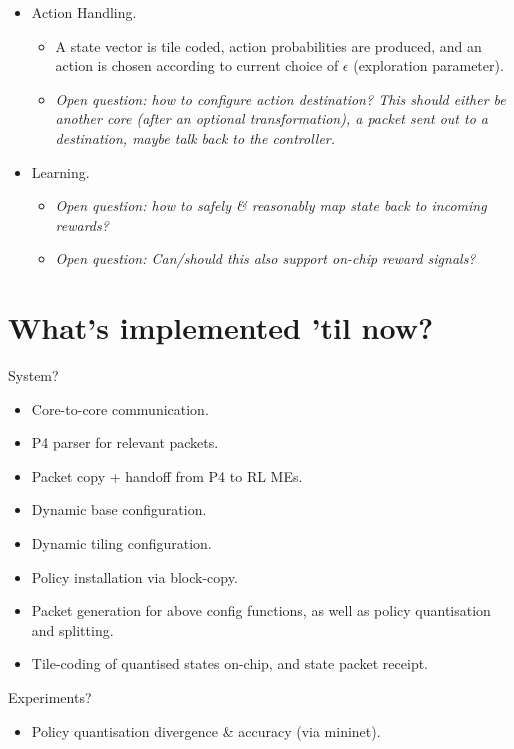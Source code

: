 \documentclass[sigconf,natbib=false]{acmart}
\begin{document}
\begin{itemize}
	\item Action Handling.
	\begin{itemize}
		\item A state vector is tile coded, action probabilities are produced, and an action is chosen according to current choice of $\epsilon$ (exploration parameter).
		\item \emph{Open question: how to configure action destination? This should either be another core (after an optional transformation), a packet sent out to a destination, maybe talk back to the controller.}
	\end{itemize}
	\item Learning.
	\begin{itemize}
		\item \emph{Open question: how to safely \& reasonably map state back to incoming rewards?}
		\item \emph{Open question: Can/should this also support on-chip reward signals?}
	\end{itemize}
\end{itemize}

\section{What's implemented 'til now?}
System?
\begin{itemize}
	\item Core-to-core communication.
	\item P4 parser for relevant packets.
	\item Packet copy + handoff from P4 to RL MEs.
	\item Dynamic base configuration.
	\item Dynamic tiling configuration.
	\item Policy installation via block-copy.
	\item Packet generation for above config functions, as well as policy quantisation and splitting.
	\item Tile-coding of quantised states on-chip, and state packet receipt.
\end{itemize}

Experiments?
\begin{itemize}
	\item Policy quantisation divergence \& accuracy (via mininet).
\end{itemize}
\end{document}
